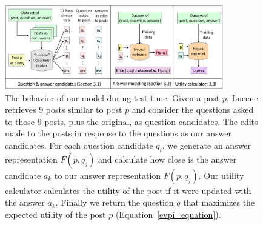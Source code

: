 \documentclass[11pt,a4paper]{article}
\begin{document}




\begin{figure}[t]
	\centering
	\includegraphics[width=0.85\textwidth]{model}
	\caption{\small The behavior of our model during test time. Given a post $p$, Lucene retrieves 9 posts similar to post $p$ and consider the questions asked to those 9 posts, plus the original, as question candidates. The edits made to the posts in response to the questions as our answer candidates. For each question candidate $q_i$, we generate an answer representation $F(p,q_j)$ and calculate how close is the answer candidate $a_k$ to our answer representation $F(p,q_j)$. Our utility calculator calculates the utility of the post if it were updated with the answer $a_k$. Finally we return the question $q$ that maximizes the expected utility of the post $p$ (Equation~\ref{evpi_equation}).}
	\label{model}
\end{figure}
\end{document}
